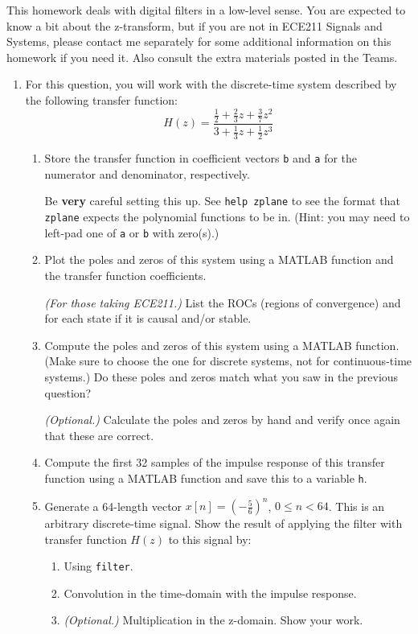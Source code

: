 \documentclass{article}
\begin{document}
	\clearpage
	\noindent This homework deals with digital filters in a low-level sense. You are expected to know a bit about the z-transform, but if you are not in ECE211 Signals and Systems, please contact me separately for some additional information on this homework if you need it. Also consult the extra materials posted in the Teams.
	\begin{enumerate}
		\item For this question, you will work with the discrete-time system described by the following transfer function:
		\begin{equation*}
			H(z)=\frac{\frac{1}{2}+\frac{2}{3}z+\frac{3}{7}z^2}{3+\frac{1}{3}z+\frac{1}{2}z^3}
		\end{equation*}
		\begin{enumerate}
			\item Store the transfer function in coefficient vectors \lstinline|b| and \lstinline|a| for the numerator and denominator, respectively.
			
			Be \textbf{very} careful setting this up. See \lstinline|help zplane| to see the format that \lstinline|zplane| expects the polynomial functions to be in. (Hint: you may need to left-pad one of \lstinline|a| or \lstinline|b| with zero(s).)
			
			\item Plot the poles and zeros of this system using a MATLAB function and the transfer function coefficients.
			
			\textit{(For those taking ECE211.)} List the ROCs (regions of convergence) and for each state if it is causal and/or stable.
			
			\item Compute the poles and zeros of this system using a MATLAB function. (Make sure to choose the one for discrete systems, not for continuous-time systems.) Do these poles and zeros match what you saw in the previous question?
			
			\textit{(Optional.)} Calculate the poles and zeros by hand and verify once again that these are correct.
			
			\item Compute the first 32 samples of the impulse response of this transfer function using a MATLAB function and save this to a variable \lstinline|h|.
			
			\item Generate a 64-length vector $x[n]=\left(-\frac{5}{6}\right)^n$, $0\le n<64$. This is an arbitrary discrete-time signal. Show the result of applying the filter with transfer function $H(z)$ to this signal by:
			\begin{enumerate}
				\item Using \lstinline|filter|.
				\item Convolution in the time-domain with the impulse response.
				\item \textit{(Optional.)} Multiplication in the z-domain. Show your work.
				

\end{enumerate}
\end{enumerate}
\end{enumerate}
\end{document}
